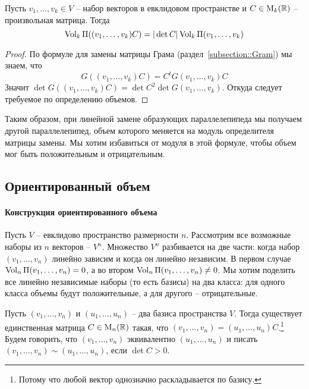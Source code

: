 \begin{claim}\label{claim::Volume}
Пусть $v_1,\ldots,v_k\in V$ -- набор векторов в евклидовом пространстве и $C\in \operatorname{M}_{k}(\mathbb R)$ -- произвольная матрица. Тогда
\[
\operatorname{Vol}_k\Pi((v_1,\ldots,v_k)C) = |\det C| \operatorname{Vol}_k\Pi(v_1,\ldots,v_k)
\]
\end{claim}
\begin{proof}
По формуле для замены матрицы Грама (раздел~\ref{subsection::Gram}) мы знаем, что
\[
G((v_1,\ldots,v_k)C) = C^t G(v_1,\ldots,v_k) C
\]
Значит $\det G((v_1,\ldots,v_k)C) = \det C^2 \det G(v_1,\ldots,v_k)$. Откуда следует требуемое по определению объемов.
\end{proof}

Таким образом, при линейной замене образующих параллелепипеда мы получаем другой параллелепипед, объем которого меняется на модуль определителя матрицы замены. Мы хотим избавиться от модуля в этой формуле, чтобы объем мог быть положительным и отрицательным.

\subsection{Ориентированный объем}

\paragraph{Конструкция ориентированного объема}
Пусть $V$ -- евклидово пространство размерности $n$. Рассмотрим все возможные наборы из $n$ векторов -- $V^n$. Множество $V^n$ разбивается на две части: когда набор $(v_1,\ldots,v_n)$ линейно зависим и когда он линейно независим. В первом случае $\operatorname{Vol}_n\Pi(v_1,\ldots,v_n) = 0$, а во втором $\operatorname{Vol}_n\Pi(v_1,\ldots,v_n)\neq 0$. Мы хотим поделить все линейно независимые наборы (то есть базисы) на два класса: для одного класса объемы будут положительные, а для другого -- отрицательные.

\begin{definition}
Пусть $(v_1,\ldots,v_n)$ и $(u_1,\ldots,u_n)$ -- два базиса пространства $V$. Тогда существует единственная матрица $C\in \operatorname{M}_{n}(\mathbb R)$ такая, что $(v_1,\ldots,v_n) = (u_1,\ldots,u_n)C$.\footnote{Потому что любой вектор однозначно раскладывается по базису.} Будем говорить, что $(v_1,\ldots,v_n)$ эквивалентно $(u_1,\ldots,u_n)$ и писать $(v_1,\ldots,v_n)\sim(u_1,\ldots,u_n)$, если $\det C > 0$.
\end{definition}

